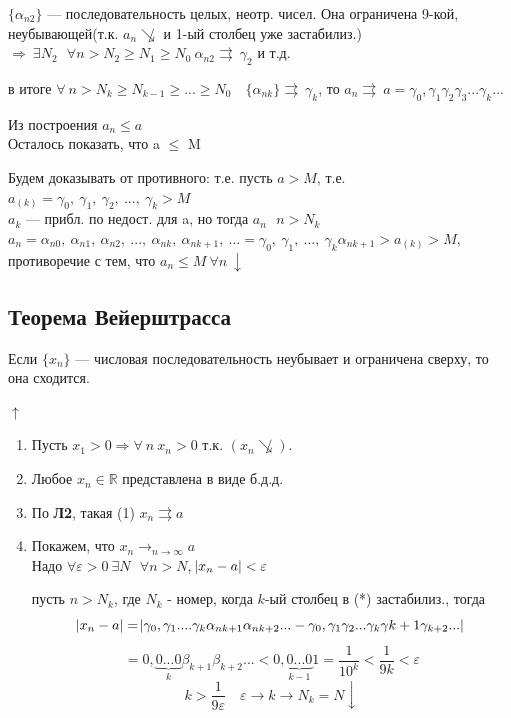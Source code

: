 \documentclass{article}
\begin{document}
    \(\{\alpha_{n2}\}\) --- последовательность целых, неотр. чисел. Она ограничена 9-кой, неубывающей(т.к. \(a_n \not\searrow\) и 1-ый столбец уже застабилиз.) \(\Rightarrow \ \exists N_2 \ \: \ \forall n > N_2 \geq N_1 \geq N_0 \ \alpha_{n2} \rightrightarrows\ \gamma_2\) и т.д.

    в итоге \( \forall\ n > N_k \geq N_{k-1} \geq ... \geq N_0\quad \{ \alpha_{nk} \} \rightrightarrows\ \gamma_k \), то \( a_n \rightrightarrows\ a = \gamma_0,\gamma_1\gamma_2\gamma_3...\gamma_k... \)
    
    Из построения \(a_n \leq a \)
    \\ Осталось показать, что a \(\leq\) M

    Будем доказывать от противного: т.е. пусть \(a > M\), т.е. \(a_{(k)} = \gamma_0,\ \gamma_1,\ \gamma_2,\ ...,\ \gamma_k > M\)
    \\ \(a_k\) --- прибл. по недост. для a, но тогда \(a_n \ \: \ n > N_k\)
    \\ \(a_n = \alpha_{n0},\ \alpha_{n1},\ \alpha_{n2},\ ...,\ \alpha_{nk},\ \alpha_{nk+1},\ ... = \gamma_0,\ \gamma_1,\ ...,\ \gamma_k\alpha_{nk+1} > a_{(k)} > M\), противоречие с тем, что \(a_n \leq M \ \forall n \ \downarrow\)
    
    \subsection{Теорема Вейерштрасса}
    
    Если \(\{ x_n \} \) --- числовая последовательность неубывает и ограничена сверху, то она сходится.

    \(\uparrow\)
    \begin{enumerate}
        \item Пусть \( x_1 > 0 \Rightarrow \forall\ n\ x_n > 0 \) т.к. \( (x_n \not\searrow ) \).

        \item Любое \( x_n \in \mathbb{R} \) представлена в виде б.д.д.

        \item По \textbf{Л2}, такая (1) \( x_n \rightrightarrows a \)

        \item Покажем, что \(x_n \longrightarrow_{n \rightarrow \infty} a\)
    \\ Надо \(\forall \varepsilon > 0 \ \exists N \ \: \ \forall n > N\), \(\abs{x_n - a} < \varepsilon\)

    пусть \( n > N_k \), где \( N_k \) - номер, когда \(k\)-ый столбец в (*) застабилиз., тогда 
    \[ \abs{x_n - a} = \abs{\gamma_0,\gamma_1....\gamma_k\alpha_{nk+1}\alpha_{nk+2}... - \gamma_0,\gamma_1\gamma_2...\gamma_k\gamma{k+1}\gamma_{k+2}...} \]
    \[ = 0,\underbrace{0...0}_k\beta_{k+1}\beta_{k+2}... < 0,\underbrace{0...0}_{k-1}1 = \frac{1}{10^k} < \frac{1}{9k} < \varepsilon \]
    \[k > \frac{1}{9\varepsilon}\quad \varepsilon \rightarrow k \rightarrow N_k = N \downarrow \]
    \end{enumerate}
\end{document}
